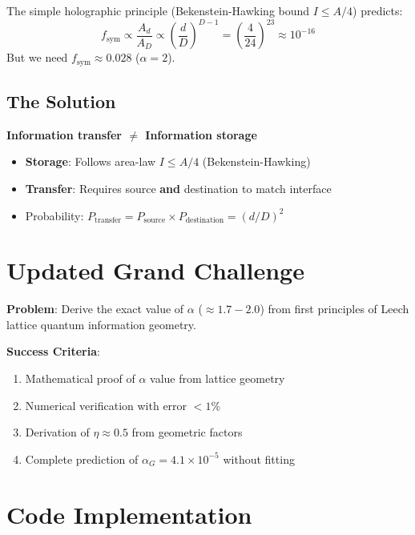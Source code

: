 \documentclass[11pt]{article}
\begin{document}
The simple holographic principle (Bekenstein-Hawking bound $I \leq A/4$) predicts:
\[
f_{\text{sym}} \propto \frac{A_d}{A_D} \propto \left(\frac{d}{D}\right)^{D-1} = \left(\frac{4}{24}\right)^{23} \approx 10^{-16}
\]
But we need $f_{\text{sym}} \approx 0.028$ ($\alpha=2$).

\subsection{The Solution}

\begin{tcolorbox}[colback=blue!5!white,colframe=blue!75!black,title=Key Insight]
\textbf{Information transfer $\neq$ Information storage}

\begin{itemize}
\item \textbf{Storage}: Follows area-law $I \leq A/4$ (Bekenstein-Hawking)
\item \textbf{Transfer}: Requires source \textbf{and} destination to match interface
\item Probability: $P_{\text{transfer}} = P_{\text{source}} \times P_{\text{destination}} = (d/D)^2$
\end{itemize}
\end{tcolorbox}

\section{Updated Grand Challenge}

\begin{tcolorbox}[colback=red!5!white,colframe=red!75!black,title=Grand Challenge \#1 (v6.6)]
\textbf{Problem}: Derive the exact value of $\alpha$ ($\approx 1.7-2.0$) from first principles of Leech lattice quantum information geometry.

\textbf{Success Criteria}:
\begin{enumerate}
\item Mathematical proof of $\alpha$ value from lattice geometry
\item Numerical verification with error $<1\%$
\item Derivation of $\eta \approx 0.5$ from geometric factors
\item Complete prediction of $\alpha_G = 4.1\times10^{-5}$ without fitting
\end{enumerate}
\end{tcolorbox}

\section{Code Implementation}
\end{document}
